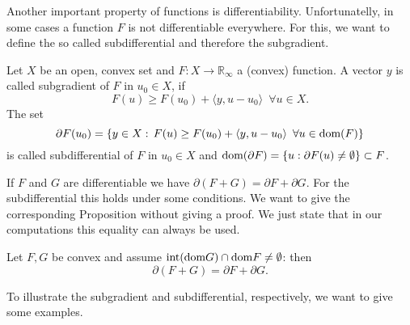     Another important property of functions is differentiability. Unfortunatelly, in some cases a function $F$ is not differentiable everywhere. For this, we want to define the so called subdifferential and therefore the subgradient.

    \begin{definition} %
        \label{def:subgradient_subdifferential}

        Let $X$ be an open, convex set and $F: X \longrightarrow \mathbb{R}_{\infty}$ a (convex) function. A vector $y$ is called subgradient of $F$ in $u_{0} \in X$, if
            \begin{equation}
                F(u) \ge F(u_{0}) + \langle y, u - u_{0} \rangle \,\,\, \forall u \in X. \label{eq:subgradient}
            \end{equation}
        The set
            \begin{equation}
                \partial F(u_{0}) = \{ y \in X: \, F(u) \ge F(u_{0}) + \langle y, u - u_{0} \rangle \,\,\, \forall u \in \textnormal{dom}(F) \}
            \end{equation}
        is called subdifferential of $F$ in $u_{0} \in X$ and $\textnormal{dom}(\partial F) = \{ u: \partial F(u) \ne \emptyset \} \subset F$.

    \end{definition}

    If $F$ and $G$ are differentiable we have $\partial(F + G) = \partial F + \partial G$. For the subdifferential this holds under some conditions. We want to give the corresponding Proposition without giving a proof. We just state that in our computations this equality can always be used.

    \begin{proposition} %

        Let $F, G$ be convex and assume $\textnormal{int} (\textnormal{dom} G) \cap \textnormal{dom} F \ne \emptyset$: then
            $$
                \partial(F + G) = \partial F + \partial G.
            $$
    
    \end{proposition}

    To illustrate the subgradient and subdifferential, respectively, we want to give some examples.

